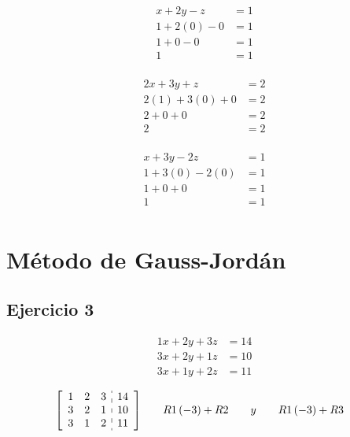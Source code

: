 \documentclass[fleqn]{article}
\begin{document}
    \begin{align*}
      x+2y-z&=1 \\
      1+2(0)-0 &= 1 \\
      1+0-0 &= 1\\
      1 &= 1 \\
    \end{align*}
    
    \begin{align*}
      2x+3y+z &= 2 \\
      2(1) + 3(0) + 0 &= 2 \\
      2 + 0 + 0 &= 2 \\
      2 &= 2 \\
    \end{align*}

    \begin{align*}
      x+3y-2z &= 1 \\
      1+3(0)-2(0) &= 1 \\
      1+0+0 &= 1 \\
      1 &= 1 \\
    \end{align*}


\section{Método de Gauss-Jordán}
  \subsection{Ejercicio 3}
    \begin{align*}
      1x+2y+3z&=14 \\
      3x+2y+1z&=10 \\
      3x+1y+2z&=11
    \end{align*}
    
    \begin{alignat*}{2}
      &\left[
        \begin{array}{ccc:c}
          1 & 2 & 3 & 14 \\
          3 & 2 & 1 & 10 \\
          3 & 1 & 2 & 11
        \end{array}
      \right]
      \quad
      && R1\left(-3\right)+R2 \qquad y \qquad R1\left(-3\right)+R3
    \end{alignat*}
\end{document}
